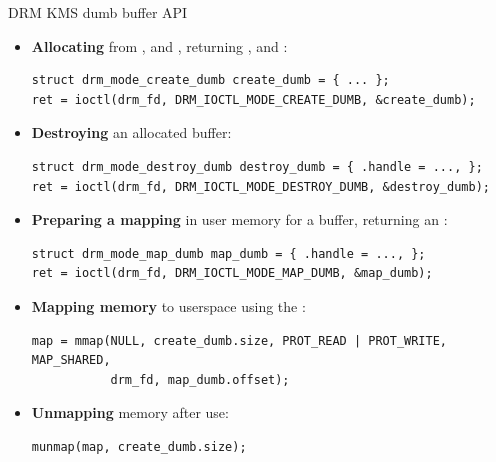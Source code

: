 \begin{frame}[fragile]{DRM KMS dumb buffer API}
  \begin{itemize}
  \item \textbf{Allocating} from ,  and , returning ,  and :\\
  \begin{verbatim}
struct drm_mode_create_dumb create_dumb = { ... };
ret = ioctl(drm_fd, DRM_IOCTL_MODE_CREATE_DUMB, &create_dumb);
  \end{verbatim}
  \item \textbf{Destroying} an allocated buffer:
  \begin{verbatim}
struct drm_mode_destroy_dumb destroy_dumb = { .handle = ..., };
ret = ioctl(drm_fd, DRM_IOCTL_MODE_DESTROY_DUMB, &destroy_dumb);
  \end{verbatim}
  \item \textbf{Preparing a mapping} in user memory for a buffer, returning an :
  \begin{verbatim}
struct drm_mode_map_dumb map_dumb = { .handle = ..., };
ret = ioctl(drm_fd, DRM_IOCTL_MODE_MAP_DUMB, &map_dumb);
  \end{verbatim}
  \item \textbf{Mapping memory} to userspace using the :
  \begin{verbatim}
map = mmap(NULL, create_dumb.size, PROT_READ | PROT_WRITE, MAP_SHARED,
           drm_fd, map_dumb.offset);
  \end{verbatim}
  \item \textbf{Unmapping} memory after use:
  \begin{verbatim}
munmap(map, create_dumb.size);
  \end{verbatim}
  \end{itemize}
\end{frame}

